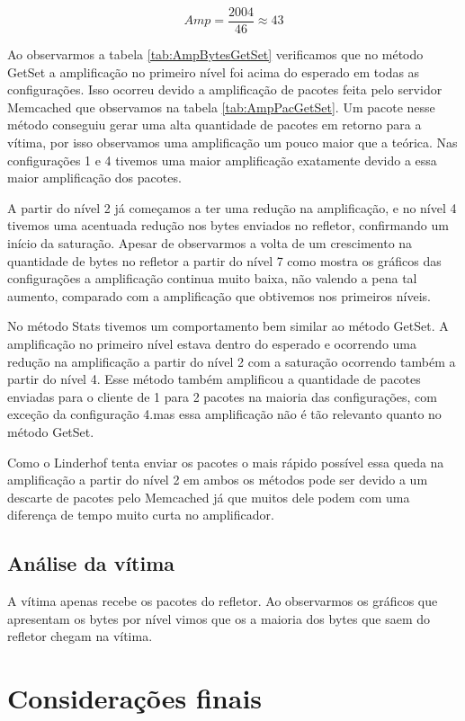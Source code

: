 \begin{equation}
Amp = \frac{2004}{46} \approx 43
\label{cal:Fator_Memcached2}
\end{equation}

Ao observarmos a tabela \ref{tab:AmpBytesGetSet} verificamos que no método GetSet a amplificação no primeiro nível foi acima do esperado em todas as configurações. Isso ocorreu devido a amplificação de pacotes feita pelo servidor Memcached que observamos na tabela \ref{tab:AmpPacGetSet}. Um pacote nesse método conseguiu gerar uma alta quantidade de pacotes em retorno para a vítima, por isso observamos uma amplificação um pouco maior que a teórica. Nas configurações 1 e 4 tivemos uma maior amplificação exatamente devido a essa maior amplificação dos pacotes.

A partir do nível 2 já começamos a ter uma redução na amplificação, e no nível 4 tivemos uma acentuada redução nos bytes enviados no refletor, confirmando um início da saturação. Apesar de observarmos a volta de um crescimento na quantidade de bytes no refletor a partir do nível 7  como mostra os gráficos das configurações a amplificação continua muito baixa, não valendo a pena tal aumento, comparado com a amplificação que obtivemos nos primeiros níveis.

No método Stats tivemos um comportamento bem similar ao método GetSet. A amplificação no primeiro nível estava dentro do esperado e ocorrendo uma redução na amplificação a partir do nível 2 com a saturação ocorrendo também a partir do nível 4. Esse método também amplificou a quantidade de pacotes enviadas para o cliente de 1 para 2 pacotes na maioria das configurações, com exceção da configuração 4.mas essa amplificação não é tão relevanto quanto no método GetSet.

Como o Linderhof tenta enviar os pacotes o mais rápido possível essa queda na amplificação a partir do nível 2 em ambos os métodos pode ser devido a um descarte de pacotes pelo Memcached já que muitos dele podem com uma diferença de tempo muito curta no amplificador. 

\subsection{Análise da vítima}

A vítima apenas recebe os pacotes do refletor. Ao observarmos os gráficos que apresentam os bytes por nível vimos que os a maioria dos bytes que saem do refletor chegam na vítima.

\section{Considerações finais}

